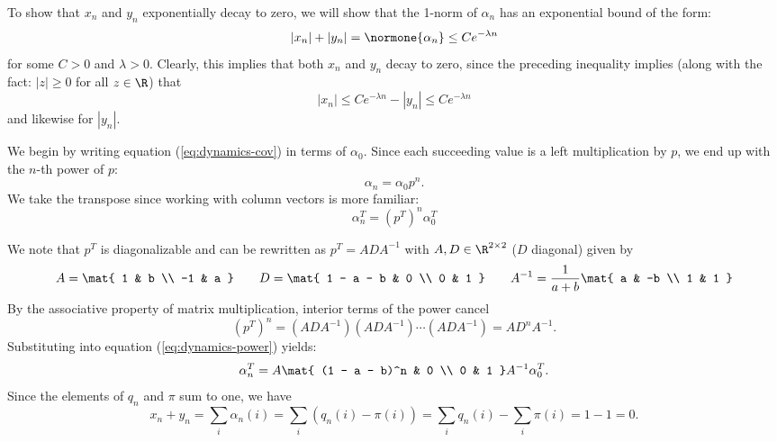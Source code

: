 \documentclass{homework}
\begin{document}
\begin{letterenum}
\item To show that $x_n$ and $y_n$ exponentially decay to zero, we 
will show that the 1-norm of $\alpha_n$ has an exponential bound of the
form:
\begin{equation*}
    |x_n| + |y_n| = \normone{\alpha_n} \leq C e^{-\lambda n}
\end{equation*}
for some $C > 0$ and $\lambda > 0$. Clearly, this implies that both
$x_n$ and $y_n$ decay to zero, since the preceding inequality implies
(along with the fact: $|z| \geq 0$ for all $z\in\R$) that
\begin{equation*}
    |x_n| \leq C e^{-\lambda n} - |y_n| \leq C e^{-\lambda n}
\end{equation*}
and likewise for $|y_n|$.


We begin by writing equation (\ref{eq:dynamics-cov}) in terms of $\alpha_0$.
Since each succeeding value is a left multiplication by $p$, we end up
with the $n$-th power of $p$:
\begin{equation*}
    \alpha_n = \alpha_0 p^n.
\end{equation*}
We take the transpose since working with column vectors is more familiar:
\begin{equation}
    \alpha_n^T = (p^T)^n \alpha_0^T
    \label{eq:dynamics-power}
\end{equation}

We note that $p^T$ is diagonalizable and can be rewritten as $p^T = ADA^{-1}$
with $A,D \in\R^{2\times 2}$ ($D$ diagonal) given by
\begin{equation*}
    A = \mat{
        1 & b \\
        -1 & a
    } \qquad
    D = \mat{
        1 - a - b & 0 \\
        0 & 1
    } \qquad
    A^{-1} = \frac{1}{a + b} \mat{
        a & -b \\
        1 & 1
    }
\end{equation*}
By the associative property of matrix multiplication,
interior terms of the power cancel
\begin{equation*}
    (p^T)^n = (ADA^{-1})(ADA^{-1})\cdots(ADA^{-1}) = AD^nA^{-1}.
\end{equation*}
Substituting into equation (\ref{eq:dynamics-power}) yields:
\begin{equation}
    \alpha_n^T = A \mat{
        (1 - a - b)^n & 0 \\
        0 & 1
    } A^{-1} \alpha_0^T.
    \label{eq:dyanmics-eigenvec-basis}
\end{equation}
Since the elements of $q_n$ and $\pi$ sum to one, we have
\begin{equation*}
    x_n + y_n = \sum_i \alpha_n(i) = \sum_i (q_n(i) - \pi(i))
        = \sum_i q_n(i) - \sum_i \pi(i)
        = 1 - 1 = 0.
\end{equation*}


\end{letterenum}
\end{document}
